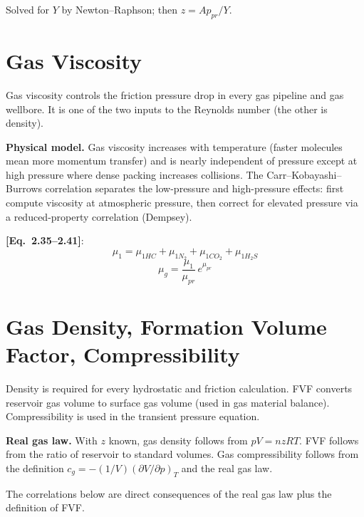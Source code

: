 \documentclass[11pt,a4paper,openany]{book}
\newcommand{\eqrefbook}[1]{\textcolor{blue!60!black}{\textbf{[Eq.~#1]}}}
\begin{document}
Solved for $Y$ by Newton--Raphson; then
$z = A p_{pr}/Y$.

\section{Gas Viscosity}

\begin{purpose}
Gas viscosity controls the friction pressure drop in every gas
pipeline and gas wellbore. It is one of the two inputs to the Reynolds
number (the other is density).
\end{purpose}

\begin{theory}
\textbf{Physical model.} Gas viscosity increases with temperature
(faster molecules mean more momentum transfer) and is nearly
independent of pressure except at high pressure where dense packing
increases collisions. The Carr--Kobayashi--Burrows correlation
separates the low-pressure and high-pressure effects: first compute
viscosity at atmospheric pressure, then correct for elevated
pressure via a reduced-property correlation (Dempsey).
\end{theory}

\eqrefbook{2.35--2.41}:
\begin{equation}
  \mu_1 = \mu_{1HC} + \mu_{1N_2} + \mu_{1CO_2} + \mu_{1H_2S}
\end{equation}
\begin{equation}
  \mu_g = \frac{\mu_1}{\mu_{pr}}\,e^{\mu_{pr}}
\end{equation}

\section{Gas Density, Formation Volume Factor, Compressibility}

\begin{purpose}
Density is required for every hydrostatic and friction calculation.
FVF converts reservoir gas volume to surface gas volume (used in gas
material balance). Compressibility is used in the transient pressure
equation.
\end{purpose}

\begin{theory}
\textbf{Real gas law.} With $z$ known, gas density follows from
$pV = nzRT$. FVF follows from the ratio of reservoir to standard
volumes. Gas compressibility follows from the definition
$c_g = -(1/V)(\partial V/\partial p)_T$ and the real gas law.

The correlations below are direct consequences of the real gas law
plus the definition of FVF.
\end{theory}
\end{document}
